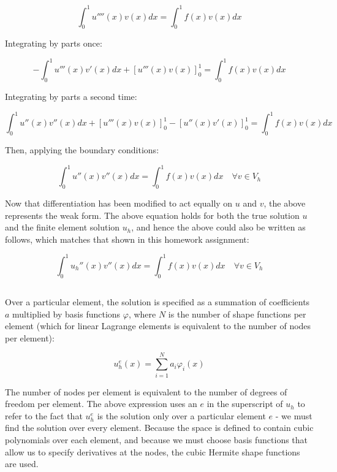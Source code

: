 \documentclass[10pt]{article}
\newcommand{\beq}{\begin{equation}}
\newcommand{\eeq}{\end{equation}}
\begin{document}
\beq
\int_{0}^{1}u''''(x)v(x)dx=\int_{0}^{1}f(x)v(x)dx
\eeq

Integrating by parts once:

\beq
-\int_{0}^{1}u'''(x)v'(x)dx+\left\lbrack u'''(x)v(x)\right\rbrack_0^1=\int_{0}^{1}f(x)v(x)dx
\eeq

Integrating by parts a second time:

\beq
\int_{0}^{1}u''(x)v''(x)dx+\left\lbrack u'''(x)v(x)\right\rbrack_0^1-\left\lbrack u''(x)v'(x)\right\rbrack_0^1=\int_{0}^{1}f(x)v(x)dx
\eeq

Then, applying the boundary conditions:

\beq
\int_{0}^{1}u''(x)v''(x)dx=\int_{0}^{1}f(x)v(x)dx \quad\forall v\in V_h
\eeq

Now that differentiation has been modified to act equally on \(u\) and \(v\), the above represents the weak form. The above equation holds for both the true solution \(u\) and the finite element solution \(u_h\), and hence the above could also be written as follows, which matches that shown in this homework assignment:

\beq
\int_{0}^{1}u_h''(x)v''(x)dx=\int_{0}^{1}f(x)v(x)dx \quad\forall v\in V_h
\eeq

\subsection{}

Over a particular element, the solution is specified as a summation of coefficients \(a\) multiplied by basis functions \(\varphi\), where \(N\) is the number of shape functions per element (which for linear Lagrange elements is equivalent to the number of nodes per element):

\beq
u_h^e(x)=\sum_{i=1}^{N}a_i\varphi_i(x)
\eeq

The number of nodes per element is equivalent to the number of degrees of freedom per element. The above expression uses an \(e\) in the superscript of \(u_h\) to refer to the fact that \(u_h^e\) is the solution only over a particular element \(e\) - we must find the solution over every element. Because the space is defined to contain cubic polynomials over each element, and because we must choose basis functions that allow us to specify derivatives at the nodes, the cubic Hermite shape functions are used. 
\end{document}
